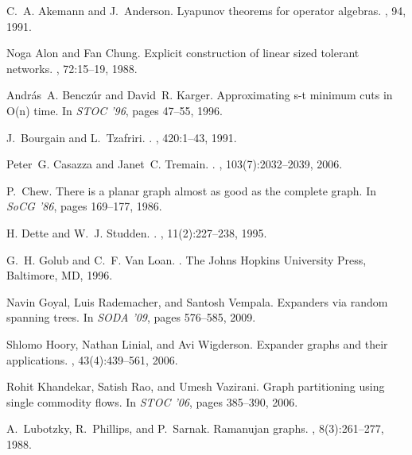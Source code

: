 \documentclass[12pt]{article}
\begin{document}
\begin{thebibliography}{11}


C.~A. Akemann and J.~Anderson.
\newblock Lyapunov theorems for operator algebras.
, 94, 1991.

Noga Alon and Fan Chung.
\newblock Explicit construction of linear sized tolerant networks.
, 72:15--19, 1988.

Andr{\'a}s~A. Bencz{\'u}r and David~R. Karger.
\newblock Approximating s-t minimum cuts in {O}(n{}) time.
\newblock In {\em STOC '96}, pages 47--55, 1996.

J.~Bourgain and L.~Tzafriri.
.
, 420:1--43, 1991.

Peter~G. Casazza and Janet~C. Tremain.
.
, 103(7):2032--2039, 2006.

P.~Chew.
\newblock There is a planar graph almost as good as the complete graph.
\newblock In {\em SoCG '86}, pages 169--177, 1986.

H. Dette and W.~J. Studden.
.
, 11(2):227--238, 1995.

G.~H. Golub and C.~F. {Van Loan}.
.
\newblock The Johns Hopkins University Press, Baltimore, MD, 1996.

Navin Goyal, Luis Rademacher, and Santosh Vempala.
\newblock Expanders via random spanning trees.
\newblock In {\em SODA '09}, pages 576--585, 2009.

Shlomo Hoory, Nathan Linial, and Avi Wigderson.
\newblock Expander graphs and their applications.
, 43(4):439--561,
  2006.

Rohit Khandekar, Satish Rao, and Umesh Vazirani.
\newblock Graph partitioning using single commodity flows.
\newblock In {\em STOC '06}, pages 385--390, 2006.

A.~Lubotzky, R.~Phillips, and P.~Sarnak.
\newblock Ramanujan graphs.
, 8(3):261--277, 1988.


\end{thebibliography}
\end{document}
